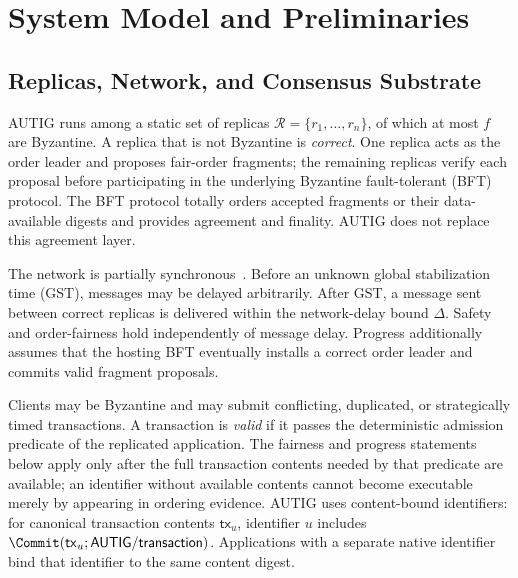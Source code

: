 
\section{System Model and Preliminaries}
\label{sec:model}

\subsection{Replicas, Network, and Consensus Substrate}

AUTIG runs among a static set of replicas
$\mathcal R=\{r_1,\ldots,r_n\}$, of which at most $f$ are Byzantine.  A
replica that is not Byzantine is \emph{correct}.  One replica acts as the
order leader and proposes fair-order fragments; the remaining replicas verify
each proposal before participating in the underlying Byzantine fault-tolerant
(BFT) protocol.  The BFT protocol totally orders accepted fragments or their
data-available digests and provides agreement and finality.  AUTIG does not
replace this agreement layer.

The network is partially synchronous~\cite{dwork1988consensus}.  Before an
unknown global stabilization time (GST), messages may be delayed arbitrarily.
After GST, a message sent between correct replicas is delivered within the
network-delay bound $\Delta$.  Safety and order-fairness hold independently of
message delay.  Progress additionally assumes that the hosting BFT eventually
installs a correct order leader and commits valid fragment proposals.

Clients may be Byzantine and may submit conflicting, duplicated, or
strategically timed transactions.  A transaction is \emph{valid} if it passes
the deterministic admission predicate of the replicated application.  The
fairness and progress statements below apply only after the full transaction
contents needed by that predicate are available; an identifier without
available contents cannot become executable merely by appearing in ordering
evidence.  AUTIG uses content-bound identifiers: for canonical transaction
contents $\mathsf{tx}_u$, identifier $u$ includes
$\Commit(\mathsf{tx}_u;\mathsf{AUTIG/transaction})$.  Applications with a
separate native identifier bind that identifier to the same content digest.

